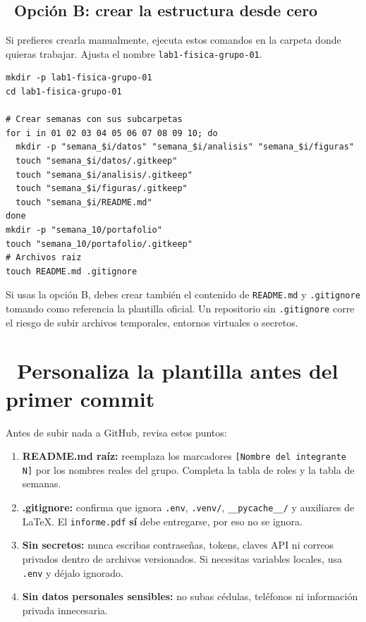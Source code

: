 \documentclass[11pt,a4paper]{article}
\newcommand{\iconotexto}[2]{\textcolor{cyanNeon}{\faIcon{#1}}~#2}
\begin{document}
\subsection{\iconotexto{terminal}{Opción B: crear la estructura desde cero}}

Si prefieres crearla manualmente, ejecuta estos comandos en la carpeta donde quieras trabajar. Ajusta el nombre \texttt{lab1-fisica-grupo-01}.

\begin{lstlisting}
mkdir -p lab1-fisica-grupo-01
cd lab1-fisica-grupo-01

# Crear semanas con sus subcarpetas
for i in 01 02 03 04 05 06 07 08 09 10; do
  mkdir -p "semana_$i/datos" "semana_$i/analisis" "semana_$i/figuras"
  touch "semana_$i/datos/.gitkeep"
  touch "semana_$i/analisis/.gitkeep"
  touch "semana_$i/figuras/.gitkeep"
  touch "semana_$i/README.md"
done
mkdir -p "semana_10/portafolio"
touch "semana_10/portafolio/.gitkeep"
# Archivos raiz
touch README.md .gitignore
\end{lstlisting}

\begin{tcolorbox}[cajaMejora,title={\faIcon{exclamation-triangle}~No olvides los archivos base}]
Si usas la opción B, debes crear también el contenido de \texttt{README.md} y \texttt{.gitignore} tomando como referencia la plantilla oficial. Un repositorio sin \texttt{.gitignore} corre el riesgo de subir archivos temporales, entornos virtuales o secretos.
\end{tcolorbox}

\section{\iconotexto{user-edit}{Personaliza la plantilla antes del primer commit}}

Antes de subir nada a GitHub, revisa estos puntos:

\begin{enumerate}[leftmargin=1.6em,itemsep=4pt,topsep=2pt]
  \item \textbf{README.md raíz:} reemplaza los marcadores \texttt{[Nombre del integrante N]} por los nombres reales del grupo. Completa la tabla de roles y la tabla de semanas.
  \item \textbf{.gitignore:} confirma que ignora \texttt{.env}, \texttt{.venv/}, \texttt{\_\_pycache\_\_/} y auxiliares de LaTeX. El \texttt{informe.pdf} \textbf{sí} debe entregarse, por eso no se ignora.
  \item \textbf{Sin secretos:} nunca escribas contraseñas, tokens, claves API ni correos privados dentro de archivos versionados. Si necesitas variables locales, usa \texttt{.env} y déjalo ignorado.
  \item \textbf{Sin datos personales sensibles:} no subas cédulas, teléfonos ni información privada innecesaria.
\end{enumerate}
\end{document}
